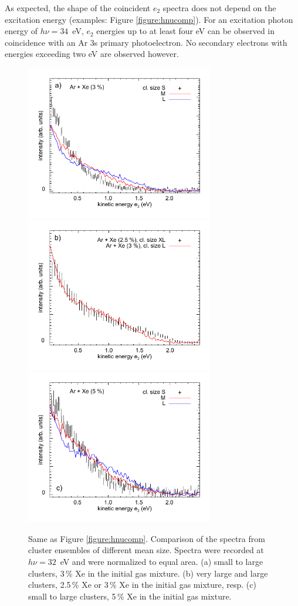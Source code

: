 \documentclass[journal=jpccck,manuscript=suppinfo]{achemso}
\begin{document}
As expected, the shape of the coincident $e_2$ spectra does not depend on the excitation energy (examples: Figure \ref{figure:hnucomp}).
For an excitation photon energy of $h\nu = 34$~eV, $e_2$ energies up to at least four eV can be observed in coincidence with an Ar 3s primary photoelectron.
No secondary electrons with energies exceeding two eV are observed however.

\begin{figure}
 \centering
 \includegraphics[width=8.2cm]{pics/661_653_cs.pdf}
 \includegraphics[width=8.2cm]{pics/867_658_cs.pdf}
 \includegraphics[width=8.2cm]{pics/630_998_cs.pdf}
 \caption{
Same as Figure \protect\ref{figure:hnucomp}.
Comparison of the spectra from cluster ensembles of different mean size.
Spectra were recorded at $h\nu = 32$~eV and were normalized to equal area. 
(a) small to large clusters, 3\,\% Xe in the initial gas mixture.
(b) very large and large clusters, 2.5\,\% Xe or 3\,\% Xe in the initial gas mixture, resp.
(c) small to large clusters, 5\,\% Xe in the initial gas mixture.
 \label{figure:sizcomp}
 }
\end{figure}
\end{document}
